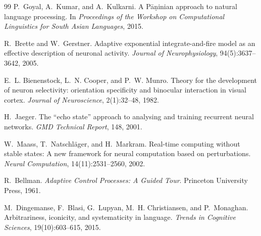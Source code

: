 \documentclass{article}
\begin{document}
\begin{thebibliography}{99}
P.~Goyal, A.~Kumar, and A.~Kulkarni.
\newblock A {P}{\={a}}{\d{n}}inian approach to natural language processing.
\newblock In \textit{Proceedings of the Workshop on Computational Linguistics
  for South Asian Languages}, 2015.

R.~Brette and W.~Gerstner.
\newblock Adaptive exponential integrate-and-fire model as an effective
  description of neuronal activity.
\newblock \textit{Journal of Neurophysiology}, 94(5):3637--3642, 2005.

E.~L. Bienenstock, L.~N. Cooper, and P.~W. Munro.
\newblock Theory for the development of neuron selectivity: orientation
  specificity and binocular interaction in visual cortex.
\newblock \textit{Journal of Neuroscience}, 2(1):32--48, 1982.

H.~Jaeger.
\newblock The ``echo state'' approach to analysing and training recurrent
  neural networks.
\newblock \textit{GMD Technical Report}, 148, 2001.

W.~Maass, T.~Natschl{\"a}ger, and H.~Markram.
\newblock Real-time computing without stable states: A new framework for
  neural computation based on perturbations.
\newblock \textit{Neural Computation}, 14(11):2531--2560, 2002.

R.~Bellman.
\newblock \textit{Adaptive Control Processes: A Guided Tour}.
\newblock Princeton University Press, 1961.

M.~Dingemanse, F.~Blasi, G.~Lupyan, M.~H. Christiansen, and P.~Monaghan.
\newblock Arbitrariness, iconicity, and systematicity in language.
\newblock \textit{Trends in Cognitive Sciences}, 19(10):603--615, 2015.

\end{thebibliography}
\end{document}
